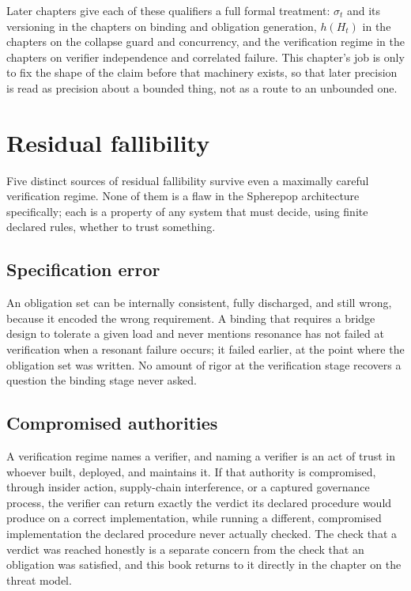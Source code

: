 \documentclass[11pt,openany]{book}
\begin{document}
Later chapters give each of these qualifiers a full formal treatment:
\(\sigma_t\) and its versioning in the chapters on binding and obligation
generation, \(h(H_t)\) in the chapters on the collapse guard and concurrency,
and the verification regime in the chapters on verifier independence and
correlated failure. This chapter's job is only to fix the shape of the claim
before that machinery exists, so that later precision is read as precision
about a bounded thing, not as a route to an unbounded one.

\section{Residual fallibility}

Five distinct sources of residual fallibility survive even a maximally careful
verification regime. None of them is a flaw in the Spherepop architecture
specifically; each is a property of any system that must decide, using finite
declared rules, whether to trust something.

\subsection{Specification error}

An obligation set can be internally consistent, fully discharged, and still
wrong, because it encoded the wrong requirement. A binding that requires a
bridge design to tolerate a given load and never mentions resonance has not
failed at verification when a resonant failure occurs; it failed earlier, at
the point where the obligation set was written. No amount of rigor at the
verification stage recovers a question the binding stage never asked.

\subsection{Compromised authorities}

A verification regime names a verifier, and naming a verifier is an act of
trust in whoever built, deployed, and maintains it. If that authority is
compromised, through insider action, supply-chain interference, or a captured
governance process, the verifier can return exactly the verdict its declared
procedure would produce on a correct implementation, while running a
different, compromised implementation the declared procedure never actually
checked. The check that a verdict was reached honestly is a separate concern
from the check that an obligation was satisfied, and this book returns to it
directly in the chapter on the threat model.
\end{document}
